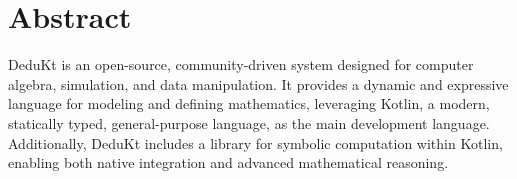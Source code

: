 \section*{Abstract}

DeduKt is an open-source, community-driven system designed for computer algebra, simulation, and data manipulation.
It provides a dynamic and expressive language for modeling and defining mathematics, leveraging Kotlin, a modern, statically typed, general-purpose language, as the main development language.
Additionally, DeduKt includes a library for symbolic computation within Kotlin, enabling both native integration and advanced mathematical reasoning.
